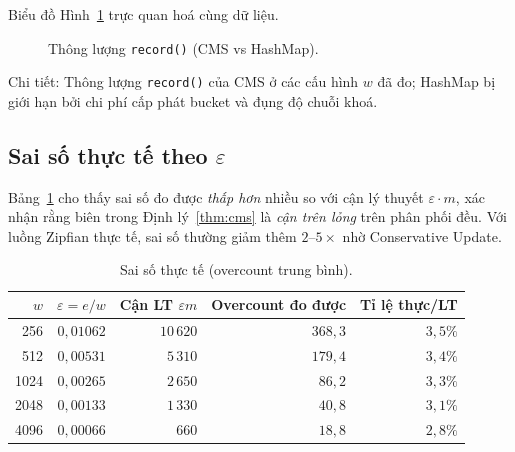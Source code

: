 Biểu đồ Hình~\ref{fig:bench-throughput} trực quan hoá cùng dữ liệu.

\begin{figure}[H]
  \centering
  \caption{Thông lượng \texttt{record()} (CMS vs HashMap).}
  \label{fig:bench-throughput}
\end{figure}

\noindent Chi tiết: Thông lượng \texttt{record()} của CMS ở các cấu hình $w$ đã đo; HashMap bị giới hạn bởi chi phí cấp phát bucket và đụng độ chuỗi khoá.

\subsection{Sai số thực tế theo \texorpdfstring{$\varepsilon$}{epsilon}}

Bảng~\ref{tab:bench-error} cho thấy sai số đo được \textit{thấp hơn} nhiều so với cận lý thuyết $\varepsilon \cdot m$, xác nhận rằng biên trong Định lý~\ref{thm:cms} là \textit{cận trên lỏng} trên phân phối đều. Với luồng Zipfian thực tế, sai số thường giảm thêm $2$--$5\times$ nhờ Conservative Update.

\begin{table}[H]
  \centering
  \caption{Sai số thực tế (overcount trung bình).}
  \label{tab:bench-error}
  \small
  \begin{tabular}{@{}r r r r r@{}}
    \toprule
    \textbf{$w$} & \textbf{$\varepsilon = e/w$} & \textbf{Cận LT $\varepsilon m$} & \textbf{Overcount đo được} & \textbf{Tỉ lệ thực/LT} \\
    \midrule
     256  & $0{,}01062$  & $10\,620$ & $368{,}3$ & $3{,}5\%$ \\
     512  & $0{,}00531$  & $5\,310$  & $179{,}4$ & $3{,}4\%$ \\
    1024  & $0{,}00265$  & $2\,650$  & $86{,}2$  & $3{,}3\%$ \\
    2048  & $0{,}00133$  & $1\,330$  & $40{,}8$  & $3{,}1\%$ \\
    4096  & $0{,}00066$  & $660$     & $18{,}8$  & $2{,}8\%$ \\
    \bottomrule
  \end{tabular}
\end{table}

